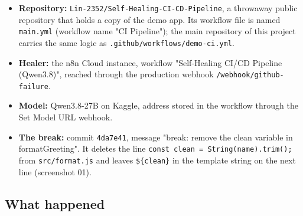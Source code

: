 \begin{itemize}[leftmargin=*, itemsep=2pt]
\item \textbf{Repository:} \texttt{Lin-\allowbreak{}2352/\allowbreak{}Self-\allowbreak{}Healing-\allowbreak{}CI-\allowbreak{}CD-\allowbreak{}Pipeline}, a throwaway public repository that holds a copy of the demo app. Its workflow file is named \texttt{main.\allowbreak{}yml} (workflow name "CI Pipeline"); the main repository of this project carries the same logic as \texttt{.\allowbreak{}github/\allowbreak{}workflows/\allowbreak{}demo-\allowbreak{}ci.\allowbreak{}yml}.
\item \textbf{Healer:} the n8n Cloud instance, workflow "Self-Healing CI/\allowbreak{}CD Pipeline (Qwen3.8)", reached through the production webhook \texttt{/\allowbreak{}webhook/\allowbreak{}github-\allowbreak{}failure}.
\item \textbf{Model:} Qwen3.8-27B on Kaggle, address stored in the workflow through the Set Model URL webhook.
\item \textbf{The break:} commit \texttt{4da7e41}, message "break: remove the clean variable in formatGreeting". It deletes the line \texttt{const clean = String(name).\allowbreak{}trim();} from \texttt{src/\allowbreak{}format.\allowbreak{}js} and leaves \texttt{\$\{clean\}} in the template string on the next line (screenshot 01).
\end{itemize}

\subsection{What happened}



